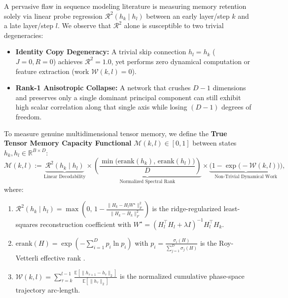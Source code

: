 \documentclass[11pt,a4paper]{article}
\begin{document}
A pervasive flaw in sequence modeling literature is measuring memory retention solely via linear probe regression $\mathcal{R}^2(h_k \mid h_l)$ between an early layer/step $k$ and a late layer/step $l$. We observe that $\mathcal{R}^2$ alone is susceptible to two trivial degeneracies:
\begin{itemize}
    \item \textbf{Identity Copy Degeneracy:} A trivial skip connection $h_l = h_k$ ($J=0, R=0$) achieves $\mathcal{R}^2 = 1.0$, yet performs zero dynamical computation or feature extraction (work $\mathcal{W}(k,l) = 0$).
    \item \textbf{Rank-1 Anisotropic Collapse:} A network that crushes $D-1$ dimensions and preserves only a single dominant principal component can still exhibit high scalar correlation along that single axis while losing $(D-1)$ degrees of freedom.
\end{itemize}

To measure genuine multidimensional tensor memory, we define the \textbf{True Tensor Memory Capacity Functional} $\mathcal{M}(k, l) \in [0, 1]$ between states $h_k, h_l \in \mathbb{R}^{B \times D}$:
\begin{equation}
    \mathcal{M}(k, l) := \underbrace{\mathcal{R}^2(h_k \mid h_l)}_{\text{Linear Decodability}} \times \underbrace{\left(\frac{\min\big(\mathrm{erank}(h_k),\, \mathrm{erank}(h_l)\big)}{D}\right)}_{\text{Normalized Spectral Rank}} \times \underbrace{\Big(1 - \exp\big(-\mathcal{W}(k, l)\big)\Big)}_{\text{Non-Trivial Dynamical Work}},
    \label{eq:true_tensor_memory}
\end{equation}
where:
\begin{enumerate}
    \item $\mathcal{R}^2(h_k \mid h_l) = \max\left(0,\, 1 - \frac{\|H_k - H_l W^\star\|_F^2}{\|H_k - \bar{H}_k\|_F^2}\right)$ is the ridge-regularized least-squares reconstruction coefficient with $W^\star = (H_l^\top H_l + \lambda I)^{-1} H_l^\top H_k$.
    \item $\mathrm{erank}(H) = \exp\left(-\sum_{i=1}^D p_i \ln p_i\right)$ with $p_i = \frac{\sigma_i(H)}{\sum_{j=1}^D \sigma_j(H)}$ is the Roy-Vetterli effective rank \cite{roy2007effective}.
    \item $\mathcal{W}(k, l) = \sum_{\tau=k}^{l-1} \frac{\mathbb{E}[\|h_{\tau+1} - h_\tau\|_2]}{\mathbb{E}[\|h_\tau\|_2]}$ is the normalized cumulative phase-space trajectory arc-length.
\end{enumerate}

\end{document}
